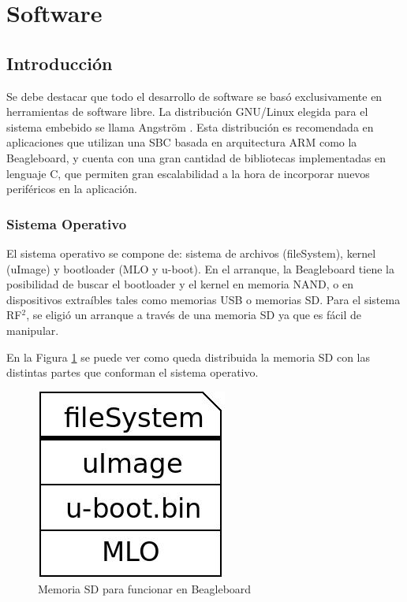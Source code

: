\documentclass[%
        final,
        notitlepage,
        narroweqnarray,
        inline,
        ]{ieee}
\begin{document}
\section{Software}

\subsection{Introducción}
Se debe destacar que todo el desarrollo de software se basó exclusivamente en herramientas de software libre. La distribución GNU/Linux elegida para el sistema embebido se llama Angström \cite{Angs}. Esta distribución es recomendada en aplicaciones que utilizan una SBC basada en arquitectura ARM como la Beagleboard, y cuenta con una gran cantidad de bibliotecas implementadas en lenguaje C, que permiten gran escalabilidad a la hora de incorporar nuevos periféricos en la aplicación.


\subsubsection{Sistema Operativo}
El sistema operativo se compone de: sistema de archivos (fileSystem), kernel (uImage) y bootloader (MLO y u-boot).
En el arranque, la Beagleboard tiene la posibilidad de buscar el bootloader y el kernel en memoria NAND, o en dispositivos extraíbles tales como memorias USB o memorias SD. Para el sistema RF$^{2}$, se eligió un arranque a través de una memoria SD ya que es fácil de manipular.

En la Figura \ref{Fig:SD} se puede ver como queda distribuida la memoria SD con las distintas partes
que conforman el sistema operativo. 

\begin{figure}[b]
\centering
  \begin{center}
  \includegraphics[scale=.4]{../docs/Imagenes/sd.jpg} 
  \end{center}
  \caption{Memoria SD para funcionar en Beagleboard}\label{Fig:SD} 
\end{figure}
\end{document}
